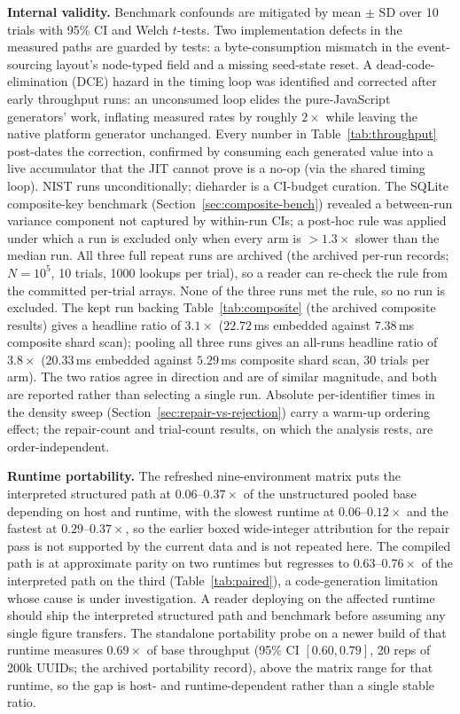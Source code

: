 \documentclass{svproc}
\begin{document}
\textbf{Internal validity.} Benchmark confounds are mitigated by mean $\pm$ SD over 10 trials with 95\% CI and Welch $t$-tests. Two implementation defects in the measured paths are guarded by tests: a byte-consumption mismatch in the event-sourcing layout's node-typed field and a missing seed-state reset. A dead-code-elimination (DCE) hazard in the timing loop was identified and corrected after early throughput runs: an unconsumed loop elides the pure-JavaScript generators' work, inflating measured rates by roughly $2\times$ while leaving the native platform generator unchanged. Every number in Table~\ref{tab:throughput} post-dates the correction, confirmed by consuming each generated value into a live accumulator that the JIT cannot prove is a no-op (via the shared timing loop). NIST runs unconditionally; dieharder is a CI-budget curation. The SQLite composite-key benchmark (Section~\ref{sec:composite-bench}) revealed a between-run variance component not captured by within-run CIs; a post-hoc rule was applied under which a run is excluded only when every arm is $>1.3\times$ slower than the median run. All three full repeat runs are archived (the archived per-run records; $N=10^5$, 10 trials, 1000 lookups per trial), so a reader can re-check the rule from the committed per-trial arrays. None of the three runs met the rule, so no run is excluded. The kept run backing Table~\ref{tab:composite} (the archived composite results) gives a headline ratio of $3.1\times$ ($22.72$\,ms embedded against $7.38$\,ms composite shard scan); pooling all three runs gives an all-runs headline ratio of $3.8\times$ ($20.33$\,ms embedded against $5.29$\,ms composite shard scan, 30 trials per arm). The two ratios agree in direction and are of similar magnitude, and both are reported rather than selecting a single run. Absolute per-identifier times in the density sweep (Section~\ref{sec:repair-vs-rejection}) carry a warm-up ordering effect; the repair-count and trial-count results, on which the analysis rests, are order-independent.

\textbf{Runtime portability.} The refreshed nine-environment matrix puts the interpreted structured path at $0.06$--$0.37\times$ of the unstructured pooled base depending on host and runtime, with the slowest runtime at $0.06$--$0.12\times$ and the fastest at $0.29$--$0.37\times$, so the earlier boxed wide-integer attribution for the repair pass is not supported by the current data and is not repeated here. The compiled path is at approximate parity on two runtimes but regresses to $0.63$--$0.76\times$ of the interpreted path on the third (Table~\ref{tab:paired}), a code-generation limitation whose cause is under investigation. A reader deploying on the affected runtime should ship the interpreted structured path and benchmark before assuming any single figure transfers. The standalone portability probe on a newer build of that runtime measures $0.69\times$ of base throughput (95\% CI $[0.60, 0.79]$, 20 reps of 200k UUIDs; the archived portability record), above the matrix range for that runtime, so the gap is host- and runtime-dependent rather than a single stable ratio.
\end{document}
